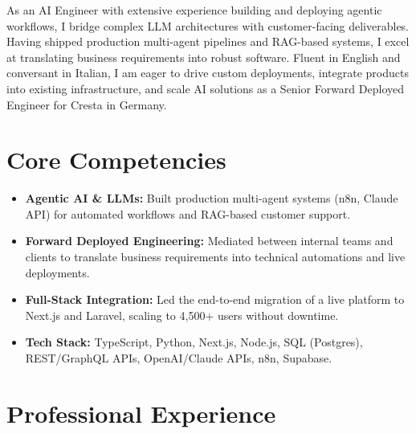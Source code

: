 \documentclass[11pt,a4paper,sans]{moderncv}
\begin{document}
\makecvtitle

As an AI Engineer with extensive experience building and deploying agentic workflows, I bridge complex LLM architectures with customer-facing deliverables. Having shipped production multi-agent pipelines and RAG-based systems, I excel at translating business requirements into robust software. Fluent in English and conversant in Italian, I am eager to drive custom deployments, integrate products into existing infrastructure, and scale AI solutions as a Senior Forward Deployed Engineer for Cresta in Germany.

\vspace{1pt}
\section{Core Competencies}
\vspace{1pt}
\begin{itemize}
\item \textbf{Agentic AI \& LLMs:} Built production multi-agent systems (n8n, Claude API) for automated workflows and RAG-based customer support.
\item \textbf{Forward Deployed Engineering:} Mediated between internal teams and clients to translate business requirements into technical automations and live deployments.
\item \textbf{Full-Stack Integration:} Led the end-to-end migration of a live platform to Next.js and Laravel, scaling to 4,500+ users without downtime.
\item \textbf{Tech Stack:} TypeScript, Python, Next.js, Node.js, SQL (Postgres), REST/GraphQL APIs, OpenAI/Claude APIs, n8n, Supabase.
\end{itemize}

\vspace{1pt}
\section{Professional Experience}
\vspace{1pt}

\end{document}
